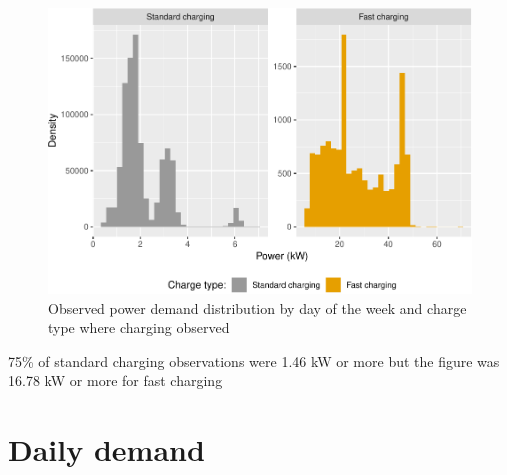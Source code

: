\documentclass[]{article}
\newenvironment{Shaded}{\begin{snugshade}}{\end{snugshade}}
\newcommand{\KeywordTok}[1]{\textcolor[rgb]{0.13,0.29,0.53}{\textbf{#1}}}
\newcommand{\StringTok}[1]{\textcolor[rgb]{0.31,0.60,0.02}{#1}}
\newcommand{\OperatorTok}[1]{\textcolor[rgb]{0.81,0.36,0.00}{\textbf{#1}}}
\newcommand{\NormalTok}[1]{#1}
\begin{document}
\begin{figure}
\centering
\includegraphics{EVBB_SummaryReport_files/figure-latex/obsPower-1.pdf}
\caption{\label{fig:obsPower}Observed power demand distribution by day of
the week and charge type where charging observed}
\end{figure}

\begin{Shaded}
\end{Shaded}

75\% of standard charging observations were 1.46 kW or more but the
figure was 16.78 kW or more for fast charging

\section{Daily demand}\label{daily-demand}
\end{document}
